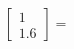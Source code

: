 \documentclass[preview]{standalone}
\begin{document}
\begin{align*}
\begin{bmatrix} 1 \\ 1.6 \end{bmatrix} =
\end{align*}
\end{document}
